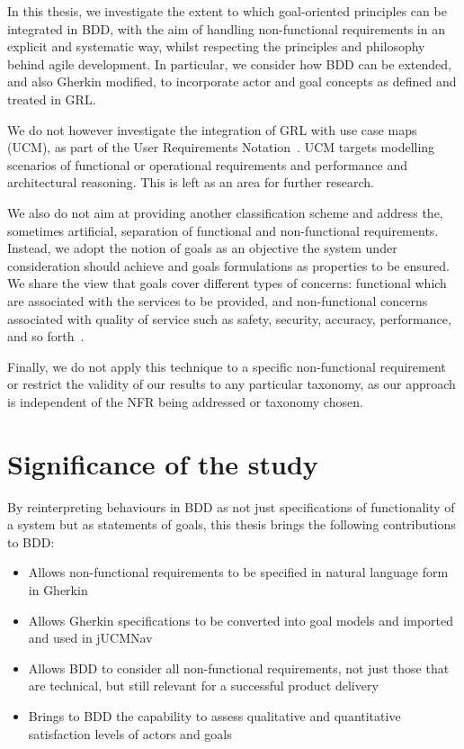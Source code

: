 \documentclass[dissertation,final]{softeng}
\begin{document}
{In this thesis, we investigate the extent to which goal-oriented principles can be integrated in BDD, with the aim of handling non-functional requirements in an explicit and systematic way, whilst respecting the principles and philosophy behind agile development. In particular, we consider how BDD can be extended, and also Gherkin modified, to incorporate actor and goal concepts as defined and treated in GRL.

We do not however investigate the integration of GRL with use case maps (UCM), as part of the User Requirements Notation~\citep{liu2004designing}. UCM targets modelling scenarios of functional or operational requirements and performance and architectural reasoning. This is left as an area for further research.

We also do not aim at providing another classification scheme and address the, sometimes artificial, separation of functional and non-functional requirements. Instead, we adopt the notion of goals as an objective the system under consideration should achieve and goals formulations as properties to be ensured. We share the view that goals cover different types of concerns: functional which are associated with the services to be provided, and non-functional concerns associated with quality of service such as safety, security, accuracy, performance, and so forth~\citep{Lamsweerde:2001wpba}.

Finally, we do not apply this technique to a specific non-functional requirement or restrict the validity of our results to any particular taxonomy, as our approach is independent of the NFR being addressed or taxonomy chosen.

\section{Significance of the study}

By reinterpreting behaviours in BDD as not just specifications of functionality of a system but as statements of goals, this thesis brings the following contributions to BDD:

\begin{center}
\begin{itemize}
\item Allows non-functional requirements to be specified in natural language form in Gherkin
\item Allows Gherkin specifications to be converted into goal models and imported and used in jUCMNav
\item Allows BDD to consider all non-functional requirements, not just those that are technical, but still relevant for a successful product delivery
\item Brings to BDD the capability to assess qualitative and quantitative satisfaction levels of actors and goals 
\end{itemize}
\end{center}

}
\end{document}

